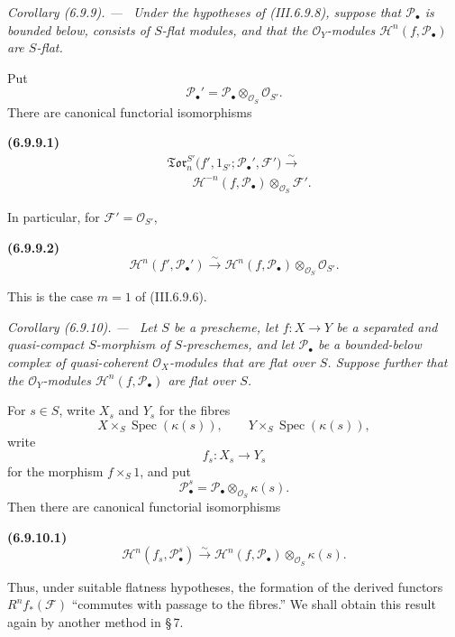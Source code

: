 \documentclass[10pt,oneside]{book}
\newcommand{\sh}[1]{\mathscr{#1}}
\newcommand{\kres}{\kappa}
\newcommand{\Spec}{\operatorname{Spec}}
\newcommand{\sref}[2][]{(#2)}
\newcommand{\oldpage}[2][]{\setcounter{footnote}{0}\marginpar{\scriptsize\textbf{#1}~|~#2}\ignorespaces}
\newenvironment{env}[1][]{\par\medskip\noindent\textbf{(#1)}\ }{\par}
\newenvironment{corollary}[1][]{\par\medskip\noindent\itshape Corollary (#1). ---\ }{\par}
\begin{document}
\begin{corollary}[6.9.9]
\label{III.6.9.9}
Under the hypotheses of \sref{III.6.9.8}, suppose that
$\sh P_\bullet$ is bounded below, consists of $S$-flat modules,
and that the $\sh O_Y$-modules
$\sh H^n(f,\sh P_\bullet)$ are $S$-flat.

\oldpage[III]{171}

Put
\[
  \sh P_\bullet'
  =
  \sh P_\bullet\otimes_{\sh O_S}\sh O_{S'}.
\]
There are canonical functorial isomorphisms
\begin{env}[6.9.9.1]
\label{III.6.9.9.1}
\[
\begin{split}
  &
  \mathfrak{Tor}_n^{S'}
  \bigl(
    f',1_{S'};\sh P_\bullet',\sh F'
  \bigr)
  \xrightarrow{\sim}
  \\
  &\qquad
  \sh H^{-n}(f,\sh P_\bullet)
  \otimes_{\sh O_S}\sh F'.
\end{split}
  \tag{6.9.9.1}\label{III.6.9.9.1.eq}
\]
\end{env}
In particular, for $\sh F'=\sh O_{S'}$,
\begin{env}[6.9.9.2]
\label{III.6.9.9.2}
\[
  \sh H^n(f',\sh P_\bullet')
  \xrightarrow{\sim}
  \sh H^n(f,\sh P_\bullet)
  \otimes_{\sh O_S}\sh O_{S'}.
  \tag{6.9.9.2}\label{III.6.9.9.2.eq}
\]
\end{env}
This is the case $m=1$ of \sref{III.6.9.6}.
\end{corollary}

\begin{corollary}[6.9.10]
\label{III.6.9.10}
Let $S$ be a prescheme, let $f:X\to Y$ be a separated and
quasi-compact $S$-morphism of $S$-preschemes, and let
$\sh P_\bullet$ be a bounded-below complex of quasi-coherent
$\sh O_X$-modules that are flat over $S$.  Suppose further that
the $\sh O_Y$-modules $\sh H^n(f,\sh P_\bullet)$ are flat over
$S$.

For $s\in S$, write $X_s$ and $Y_s$ for the fibres
\[
  X\times_S\Spec(\kres(s)),
  \qquad
  Y\times_S\Spec(\kres(s)),
\]
write
\[
  f_s:X_s\longrightarrow Y_s
\]
for the morphism $f\times_S1$, and put
\[
  \sh P_\bullet^s
  =
  \sh P_\bullet\otimes_{\sh O_S}\kres(s).
\]
Then there are canonical functorial isomorphisms
\begin{env}[6.9.10.1]
\label{III.6.9.10.1}
\[
  \sh H^n(f_s,\sh P_\bullet^s)
  \xrightarrow{\sim}
  \sh H^n(f,\sh P_\bullet)
  \otimes_{\sh O_S}\kres(s).
  \tag{6.9.10.1}\label{III.6.9.10.1.eq}
\]
\end{env}
\end{corollary}

Thus, under suitable flatness hypotheses, the formation of the
derived functors $R^nf_*(\sh F)$ ``commutes with passage to the
fibres.''  We shall obtain this result again by another method in
\S\,7.
\end{document}
